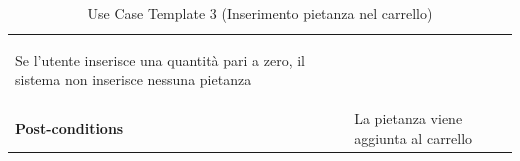 \documentclass{article}
\begin{document}
\begin{table}
\begin{tabularx}{\textwidth}{|lX|}
\begin{description}[nosep,before=\leavevmode\vspace*{-1\baselineskip},after=\leavevmode\vspace*{-1\baselineskip}]
                                                                        \item [4b.] Se l'utente inserisce una quantità pari a zero, il sistema non inserisce nessuna pietanza
                                                                    \end{description} \\
                    \rowcolor{white} \textbf{Post-conditions} & La pietanza viene aggiunta al carrello \\
                    \toprule
                \end{tabularx}
                \caption{Use Case Template 3 (Inserimento pietanza nel carrello)}
                \label{tab:use-case-template-3}
            \end{table}
\end{document}
